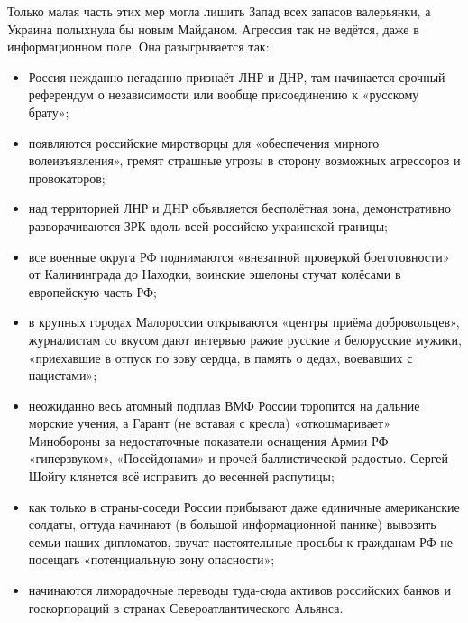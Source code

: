 Только малая часть этих мер могла лишить Запад всех запасов валерьянки, а
Украина полыхнула бы новым Майданом. Агрессия так не ведётся, даже в
информационном поле. Она разыгрывается так:

\begin{itemize} %
\item Россия нежданно-негаданно признаёт ЛНР и ДНР, там начинается срочный референдум о независимости или вообще присоединению к «русскому брату»;
    
\item появляются российские миротворцы для «обеспечения мирного волеизъявления», гремят страшные угрозы в сторону возможных агрессоров и провокаторов;
    
\item над территорией ЛНР и ДНР объявляется бесполётная зона, демонстративно разворачиваются ЗРК вдоль всей российско-украинской границы;
    
\item все военные округа РФ поднимаются «внезапной проверкой боеготовности» от
				Калининграда до Находки, воинские эшелоны стучат колёсами в европейскую
				часть РФ;
    
\item в крупных городах Малороссии открываются «центры приёма добровольцев»,
				журналистам со вкусом дают интервью ражие русские и белорусские мужики,
				«приехавшие в отпуск по зову сердца, в память о дедах, воевавших с
				нацистами»;

\item неожиданно весь атомный подплав ВМФ России торопится на дальние морские
				учения, а Гарант (не вставая с кресла) «откошмаривает» Минобороны за
				недостаточные показатели оснащения Армии РФ «гиперзвуком»,
				«Посейдонами» и прочей баллистической радостью. Сергей Шойгу клянется
				всё исправить до весенней распутицы;

\item как только в страны-соседи России прибывают даже единичные американские
				солдаты, оттуда начинают (в большой информационной панике) вывозить
				семьи наших дипломатов, звучат настоятельные просьбы к гражданам РФ не
				посещать «потенциальную зону опасности»;

\item начинаются лихорадочные переводы туда-сюда активов российских банков и
				госкорпораций в странах Североатлантического Альянса.

\end{itemize} %


